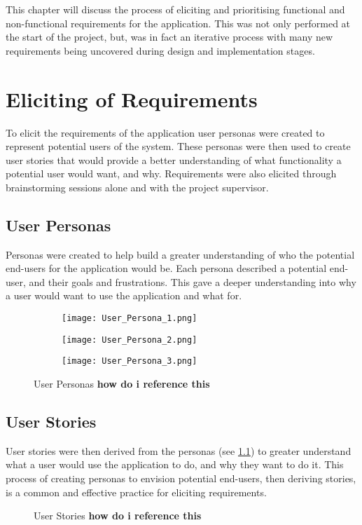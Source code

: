 This chapter will discuss the process of eliciting and prioritising functional and non-functional requirements for the application. This was not only performed at the start of the project, but, was in fact an iterative process with many new requirements being uncovered during design and implementation stages.
\section{Eliciting of Requirements}
To elicit the requirements of the application user personas were created to represent potential users of the system. These personas were then used to create user stories that would provide a better understanding of what functionality a potential user would want, and why. Requirements were also elicited through brainstorming sessions alone and with the project supervisor.
\subsection{User Personas} \label{personas}
Personas were created to help build a greater understanding of who the potential end-users for the application would be. Each persona described a potential end-user, and their goals and frustrations. This gave a deeper understanding into why a user would want to use the application and what for.
\begin{figure}[!htbp]
    \centering
    \begin{subfigure}[b]{0.45\textwidth}
        \texttt{[image: User\_Persona\_1.png]}
    \end{subfigure}
    \begin{subfigure}[b]{0.45\textwidth}
        \texttt{[image: User\_Persona\_2.png]}
    \end{subfigure}
    \begin{subfigure}[b]{0.45\textwidth}
        \texttt{[image: User\_Persona\_3.png]}
    \end{subfigure}
    \caption{User Personas \textbf{how do i reference this}}
    \label{fig:personas}
\end{figure}
\FloatBarrier
\subsection{User Stories}
User stories were then derived from the personas (see \ref{personas}) to greater understand what a user would use the application to do, and why they want to do it. This process of creating personas to envision potential end-users, then deriving stories, is a common and effective practice for eliciting requirements. 
\begin{figure}[!htbp]
    \centering
    \begin{subfigure}[b]{0.90\textwidth}
    \end{subfigure}
    \caption{User Stories \textbf{how do i reference this}}
    \label{fig:stories}
\end{figure}
\FloatBarrier
